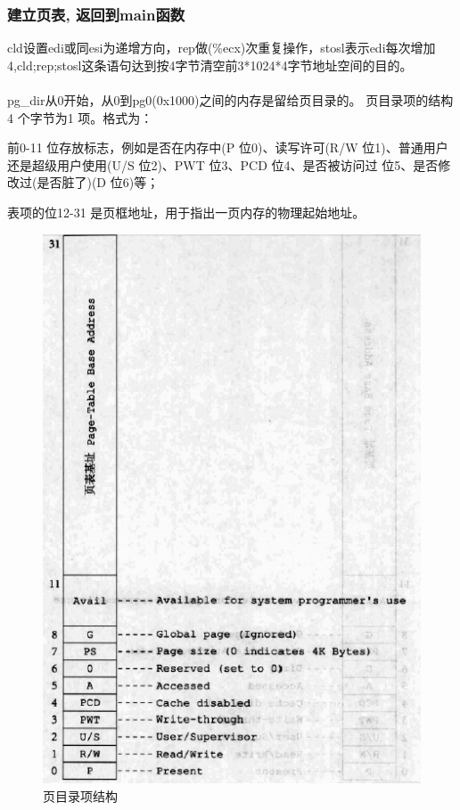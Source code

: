 \documentclass[12pt]{article}
\begin{document}
\subsubsection{建立页表, 返回到main函数}	
cld设置edi或同esi为递增方向，rep做(\%ecx)次重复操作，stosl表示edi每次增加4,cld;rep;stosl这条语句达到按4字节清空前3*1024*4字节地址空间的目的。\\\\
pg\_dir从0开始，从0到pg0(0x1000)之间的内存是留给页目录的。
页目录项的结构4 个字节为1 项。格式为：
\begin{list}{•}{•}
\item 前0-11 位存放标志，例如是否在内存中(P 位0)、读写许可(R/W 位1)、普通用户还是超级用户使用(U/S 位2)、PWT 位3、PCD 位4、是否被访问过 位5、是否修改过(是否脏了)(D 位6)等；
\item 表项的位12-31 是页框地址，用于指出一页内存的物理起始地址。
\end{list}
\begin{figure}[htbp]
\centering
\includegraphics[scale=0.5]{fig/10.png}
\caption{页目录项结构}
\label{fig:PDE}
\end{figure}
\end{document}
